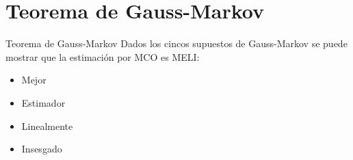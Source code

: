 \section[Gauss-Markov]{Teorema de Gauss-Markov}
\begin{frame}{Teorema de Gauss-Markov} 
	Dados los cincos supuestos de Gauss-Markov se puede mostrar que la estimación por MCO es MELI:
	\begin{itemize}
		\item Mejor
		\item Estimador
		\item Linealmente 
		\item Insesgado
	\end{itemize}
\end{frame}